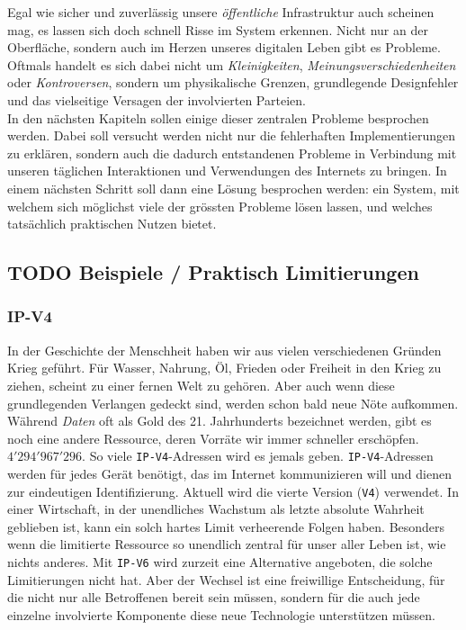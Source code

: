 \documentclass[11pt]{article}
\begin{document}
\noindent Egal wie sicher und zuverlässig unsere \emph{öffentliche}
Infrastruktur auch scheinen mag, es lassen sich doch schnell Risse im
System erkennen. Nicht nur an der Oberfläche, sondern auch im Herzen
unseres digitalen Leben gibt es Probleme. Oftmals handelt es sich
dabei nicht um \emph{Kleinigkeiten}, \emph{Meinungsverschiedenheiten} oder
\emph{Kontroversen}, sondern um physikalische Grenzen, grundlegende
Designfehler und das vielseitige Versagen der involvierten Parteien.\\

\noindent In den nächsten Kapiteln sollen einige dieser zentralen
Probleme besprochen werden. Dabei soll versucht werden nicht nur die
fehlerhaften Implementierungen zu erklären, sondern auch die dadurch
entstandenen Probleme in Verbindung mit unseren täglichen
Interaktionen und Verwendungen des Internets zu bringen. In einem
nächsten Schritt soll dann eine Lösung besprochen werden: ein System,
mit welchem sich möglichst viele der grössten Probleme lösen lassen,
und welches tatsächlich praktischen Nutzen bietet.\\
\subsection{{\bfseries\sffamily TODO} Beispiele / Praktisch Limitierungen}
\label{sec:org9c1c5cd}
\subsubsection{IP-V4}
\label{sec:org96db940}
\noindent In der Geschichte der Menschheit haben wir aus vielen
verschiedenen Gründen Krieg geführt. Für Wasser, Nahrung, Öl, Frieden
oder Freiheit in den Krieg zu ziehen, scheint zu einer fernen Welt zu
gehören. Aber auch wenn diese grundlegenden Verlangen gedeckt sind,
werden schon bald neue Nöte aufkommen. Während \emph{Daten} oft als Gold
des 21. Jahrhunderts bezeichnet werden, gibt es noch eine andere
Ressource, deren Vorräte wir immer schneller erschöpfen. \\

\noindent \(4'294'967'296\). So viele \texttt{IP-V4}-Adressen wird es jemals
geben. \texttt{IP-V4}-Adressen werden für jedes Gerät benötigt, das im Internet
kommunizieren will und dienen zur eindeutigen Identifizierung. Aktuell
wird die vierte Version (\texttt{V4}) verwendet. In einer Wirtschaft, in der
unendliches Wachstum als letzte absolute Wahrheit geblieben ist, kann
ein solch hartes Limit verheerende Folgen haben. Besonders wenn die
limitierte Ressource so unendlich zentral für unser aller Leben ist,
wie nichts anderes. Mit \texttt{IP-V6} wird zurzeit eine Alternative angeboten,
die solche Limitierungen nicht hat. Aber der Wechsel ist eine
freiwillige Entscheidung, für die nicht nur alle Betroffenen bereit
sein müssen, sondern für die auch jede einzelne involvierte Komponente
diese neue Technologie unterstützen müssen.\\
\end{document}
